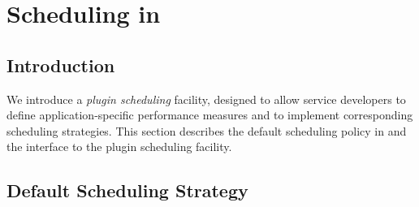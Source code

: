 

\newenvironment{code}
{\begin{list}{}{\setlength{\leftmargin}{1em}}\item\bfseries\tt}
{\end{list}}

\newenvironment{tinycode}
{\begin{list}{}{\setlength{\leftmargin}{1em}}\item\tiny\bfseries\tt}
{\end{list}}


\chapter{Scheduling in \diet}
\label{ch:plugin}

\section{Introduction}

We introduce a \emph{plugin scheduling} facility, designed to allow
\diet service developers to define application-specific performance
measures and to implement corresponding scheduling strategies.  This
section describes the default scheduling policy in \diet and the
interface to the plugin scheduling facility.

\section{Default Scheduling Strategy}\label{sect:default_sched}

